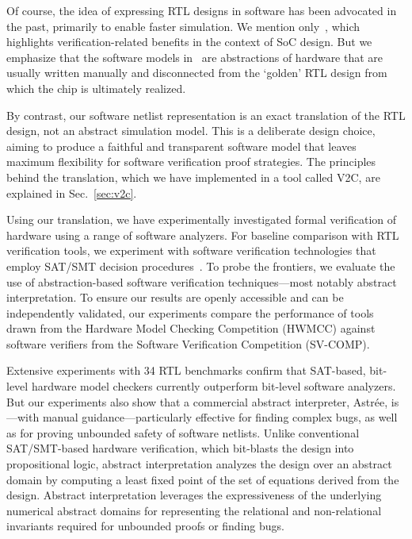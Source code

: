 Of course, the idea of expressing RTL designs in software has been
advocated in the past, primarily to enable faster simulation.  We mention
only~\cite{soc-keating}, which highlights verification-related benefits in
the context of SoC design.  But we emphasize that the software models
in~\cite{soc-keating} are abstractions of hardware that are usually written
manually and disconnected from the `golden' RTL design from which the chip
is ultimately realized.

By contrast, our software netlist representation is an exact
translation of the RTL design, not an abstract simulation model.  This is a
deliberate design choice, aiming to produce a faithful and transparent
software model that leaves maximum flexibility for software verification
proof strategies.  The principles behind the translation, which we have
implemented in a tool called V2C, are explained in Sec.\ \ref{sec:v2c}.

Using our translation, we have experimentally investigated formal
verification of hardware using a range of software analyzers.  For
baseline comparison with RTL verification tools, we experiment with software
verification technologies that employ SAT/SMT decision
procedures~\cite{DBLP:conf/cav/BeyerK11, 2ls, cbmc.tacas:2004,
DBLP:conf/tacas/HeizmannDGLMSP16}.  To probe the frontiers, we evaluate the
use of abstraction-based software verification techniques---most notably
abstract interpretation.  To ensure our results are openly accessible and
can be independently validated, our experiments compare the performance of
tools drawn from the Hardware Model Checking Competition
(HWMCC) against software verifiers from the Software Verification
Competition (SV-COMP).

Extensive experiments with 34 RTL benchmarks confirm that SAT-based,
bit-level hardware model checkers currently outperform bit-level software
analyzers.  But our experiments also show that a commercial abstract
interpreter, Astr{\'e}e, is---with manual guidance---particularly effective for
finding complex bugs, as well as for proving unbounded safety of software netlists.  
Unlike conventional SAT/SMT-based hardware verification, which
bit-blasts the design into propositional logic, abstract interpretation
analyzes the design over an abstract domain by computing a least fixed
point of the set of equations derived from the design.  Abstract
interpretation leverages the expressiveness of the underlying
numerical abstract domains for representing the relational and
non-relational invariants required for unbounded proofs or finding bugs.

